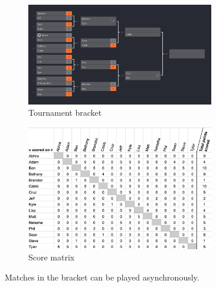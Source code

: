 \documentclass[letterpaper, 10 pt, conference]{ieeeconf}  %
\begin{document}
\begin{figure}[hb]
        \centering
        \begin{subfigure}[h]{0.4\textwidth}
                \centering
                \includegraphics[width=0.9\textwidth]{fig/singles-bracket_4.png}
                \caption{Tournament bracket}
        \end{subfigure}
        \begin{subfigure}[h]{0.4\textwidth}
                \centering
                \includegraphics[width=0.9\textwidth]{fig/score-matrix_4.png}
                \caption{Score matrix}
        \end{subfigure}
        \caption{Matches in the bracket can be played asynchronously.}
\end{figure}
\end{document}
